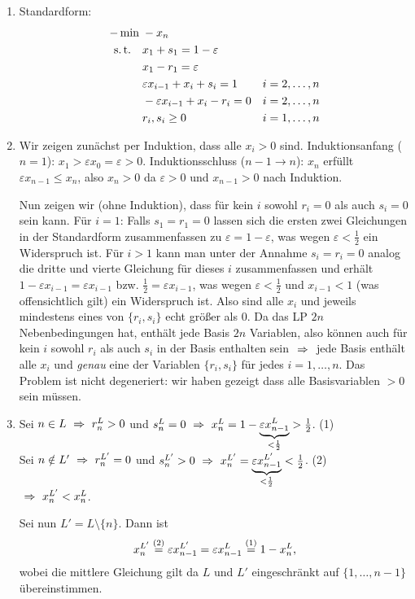 \documentclass[11pt,german,a4paper,parskip=half-]{scrartcl}
\begin{document}
\begin{solution}
\begin{enumerate}
 \item Standardform:
\begin{align*}
 -\min\;&-x_n\\
\text{s.\,t.}\quad&x_1 + s_1 = 1-\varepsilon\\
&x_1-r_1 = \varepsilon\\
&\varepsilon x_{i-1} + x_i + s_i = 1&i=2,\dotsc,n\\
&-\varepsilon x_{i-1} + x_i - r_i = 0&i=2,\dotsc,n\\
&r_i,s_i \geq 0&i=1,\dotsc,n
\end{align*}
\item Wir zeigen zunächst per Induktion, dass alle $x_i>0$ sind. Induktionsanfang ($n=1$): $x_1 > \varepsilon x_0 = \varepsilon > 0$. Induktionsschluss ($n-1\rightarrow n$):
$x_n$ erfüllt $\varepsilon x_{n-1} \leq x_n$, also $x_n > 0$ da $\varepsilon >0$ und $x_{n-1} > 0$ nach Induktion.

Nun zeigen wir (ohne Induktion), dass für kein $i$ sowohl $r_i=0$ als auch $s_i=0$ sein kann. Für $i=1$: Falls $s_1=r_1=0$ lassen sich die ersten zwei Gleichungen in der Standardform zusammenfassen zu
$\varepsilon = 1-\varepsilon$, was wegen $\varepsilon < \frac12$ ein Widerspruch ist. Für $i>1$ kann man unter der Annahme $s_i=r_i=0$ analog die dritte und vierte Gleichung für dieses $i$ zusammenfassen
und erhält $1-\varepsilon x_{i-1} = \varepsilon x_{i-1}$ bzw. $\frac12 = \varepsilon x_{i-1}$, was wegen $\varepsilon < \frac12$ und $x_{i-1} < 1$ (was offensichtlich gilt) ein Widerspruch ist.
Also sind alle $x_i$ und jeweils mindestens eines von $\{r_i,s_i\}$ echt größer als $0$. Da das LP $2n$ Nebenbedingungen hat, enthält jede Basis $2n$ Variablen, also können auch für kein $i$ sowohl 
$r_i$ als auch $s_i$ in der Basis enthalten sein $\ \Rightarrow\ $ jede Basis enthält alle $x_i$ und \emph{genau} eine der Variablen $\{r_i,s_i\}$ für jedes $i=1,\dotsc,n$. Das Problem ist nicht degeneriert: wir haben
gezeigt dass alle Basisvariablen $>0$ sein müssen.
\item Sei $n \in L \ \Rightarrow\  r^L_n > 0$ und $s^L_n = 0 \ \Rightarrow\  x_n^L = 1-\underbrace{\varepsilon x_{n-1}^L}_{<\frac12} > \frac12$. (1)\\
Sei $n \notin L' \ \Rightarrow\  r_n^{L'} = 0$ und $s_n^{L'} > 0 \ \Rightarrow\  x_n^{L'} = \underbrace{\varepsilon x_{n-1}^{L'}}_{<\frac12} < \frac12$. (2)\\
$\ \Rightarrow\  x_n^{L'} < x_n^{L}$.

Sei nun $L' = L\setminus \{n\}$. Dann ist
\[x_n^{L'} \stackrel{\text{(2)}}{=} \varepsilon x_{n-1}^{L'} = \varepsilon x_{n-1}^L \stackrel{\text{(1)}}{=} 1-x_n^L\text{,}\]
wobei die mittlere Gleichung gilt da $L$ und $L'$ eingeschränkt auf $\{1,\dotsc,n-1\}$ übereinstimmen.

\end{enumerate}
\end{solution}
\end{document}
